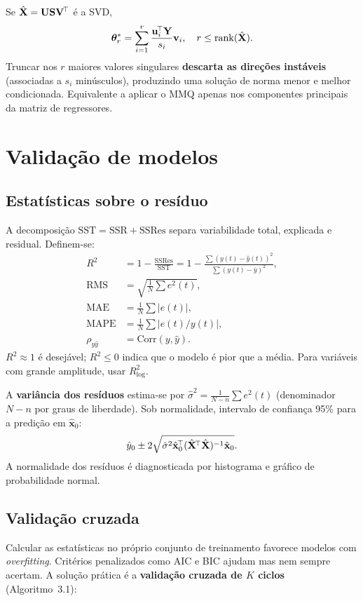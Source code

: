 Se $\hat{\mathbf{X}}=\mathbf{U}\mathbf{S}\mathbf{V}^{\!\top}$ é a SVD,
\[
\boldsymbol\theta_{r}^{*}=
\sum_{i=1}^{r}\frac{\mathbf{u}_i^{\!\top}\mathbf{Y}}{s_i}\mathbf{v}_i,
\quad r\leq \mathrm{rank}(\hat{\mathbf{X}}).
\]
Truncar nos $r$ maiores valores singulares \textbf{descarta as
direções instáveis} (associadas a $s_i$ minúsculos), produzindo uma
solução de norma menor e melhor condicionada. Equivalente a aplicar o
MMQ apenas nos componentes principais da matriz de regressores.

\section{Validação de modelos}

\subsection{Estatísticas sobre o resíduo}

A decomposição $\mathrm{SST}=\mathrm{SSR}+\mathrm{SSRes}$ separa
variabilidade total, explicada e residual. Definem-se:
\begin{align*}
R^2 &= 1-\frac{\mathrm{SSRes}}{\mathrm{SST}}
     = 1-\frac{\sum (y(t)-\hat{y}(t))^2}{\sum(y(t)-\bar{y})^2}, \\
\mathrm{RMS} &= \sqrt{\tfrac{1}{N}\textstyle\sum e^2(t)}, \\
\mathrm{MAE} &= \tfrac{1}{N}\textstyle\sum |e(t)|, \\
\mathrm{MAPE} &= \tfrac{1}{N}\textstyle\sum |e(t)/y(t)|, \\
\rho_{y\hat{y}} &= \mathrm{Corr}(y,\hat{y}).
\end{align*}
$R^2\approx 1$ é desejável; $R^2\leq 0$ indica que o modelo é pior que
a média. Para variáveis com grande amplitude, usar $R^2_{\log}$.

A \textbf{variância dos resíduos} estima-se por
$\hat\sigma^2=\tfrac{1}{N-n}\sum e^2(t)$ (denominador $N-n$ por graus
de liberdade). Sob normalidade, intervalo de confiança 95\% para a
predição em $\hat{\mathbf{x}}_0$:
\[
\hat{y}_0 \pm 2\sqrt{\hat\sigma^2 \hat{\mathbf{x}}_0^{\!\top}
(\hat{\mathbf{X}}^{\!\top}\hat{\mathbf{X}})^{-1}\hat{\mathbf{x}}_0}.
\]
A normalidade dos resíduos é diagnosticada por histograma e gráfico de
probabilidade normal.

\subsection{Validação cruzada}

Calcular as estatísticas no próprio conjunto de treinamento favorece
modelos com \emph{overfitting}. Critérios penalizados como AIC e BIC
ajudam mas nem sempre acertam. A solução prática é a
\textbf{validação cruzada de $K$ ciclos} (Algoritmo~3.1):


